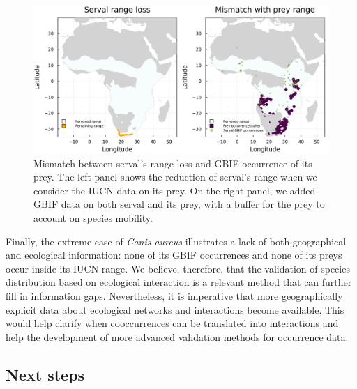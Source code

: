 \documentclass[10pt,oneside]{article}
\makeatletter
\def\maxwidth{\ifdim\Gin@nat@width>\linewidth\linewidth
\else\Gin@nat@width\fi}
\let\Oldincludegraphics\includegraphics
\renewcommand{\includegraphics}[1]{\Oldincludegraphics[width=\maxwidth]{#1}}
\makeatother
\begin{document}
\begin{figure}
\hypertarget{fig:serval}{%
\centering
\includegraphics{figures/serval_mismatch_combined.png}
\caption{Mismatch between serval's range loss and GBIF occurrence of its
prey. The left panel shows the reduction of serval's range when we
consider the IUCN data on its prey. On the right panel, we added GBIF
data on both serval and its prey, with a buffer for the prey to account
on species mobility.}\label{fig:serval}
}
\end{figure}

Finally, the extreme case of \emph{Canis aureus} illustrates a lack of
both geographical and ecological information: none of its GBIF
occurrences and none of its preys occur inside its IUCN range. We
believe, therefore, that the validation of species distribution based on
ecological interaction is a relevant method that can further fill in
information gaps. Nevertheless, it is imperative that more
geographically explicit data about ecological networks and interactions
become available. This would help clarify when cooccurrences can be
translated into interactions and help the development of more advanced
validation methods for occurrence data.

\hypertarget{next-steps}{%
\subsection{Next steps}\label{next-steps}}
\end{document}
